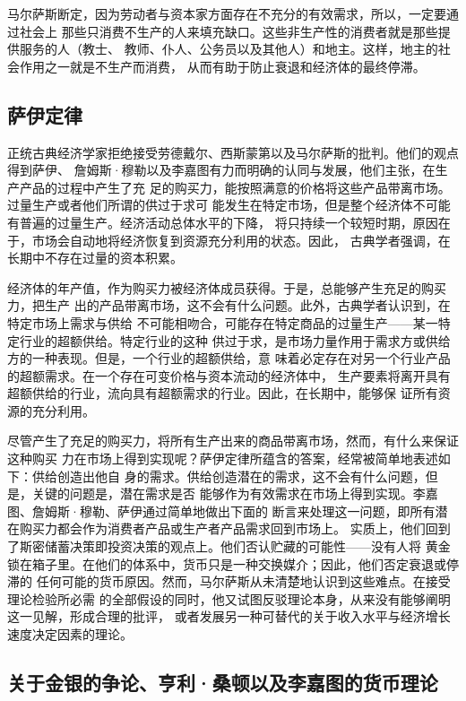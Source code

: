 马尔萨斯断定，因为劳动者与资本家方面存在不充分的有效需求，所以，一定要通过社会上
那些只消费不生产的人来填充缺口。这些非生产性的消费者就是那些提供服务的人（教士、
教师、仆人、公务员以及其他人）和地主。这样，地主的社会作用之一就是不生产而消费，
从而有助于防止衰退和经济体的最终停滞。

\subsection{萨伊定律}

正统古典经济学家拒绝接受劳德戴尔、西斯蒙第以及马尔萨斯的批判。他们的观点得到萨伊、
詹姆斯·穆勒以及李嘉图有力而明确的认同与发展，他们主张，在生产产品的过程中产生了充
足的购买力，能按照满意的价格将这些产品带离市场。过量生产或者他们所谓的供过于求可
能发生在特定市场，但是整个经济体不可能有普遍的过量生产。经济活动总体水平的下降，
将只持续一个较短时期，原因在于，市场会自动地将经济恢复到资源充分利用的状态。因此，
古典学者强调，在长期中不存在过量的资本积累。

经济体的年产值，作为购买力被经济体成员获得。于是，总能够产生充足的购买力，把生产
出的产品带离市场，这不会有什么问题。此外，古典学者认识到，在特定市场上需求与供给
不可能相吻合，可能存在特定商品的过量生产——某一特定行业的超额供给。特定行业的这种
供过于求，是市场力量作用于需求方或供给方的一种表现。但是，一个行业的超额供给，意
味着必定存在对另一个行业产品的超额需求。在一个存在可变价格与资本流动的经济体中，
生产要素将离开具有超额供给的行业，流向具有超额需求的行业。因此，在长期中，能够保
证所有资源的充分利用。

尽管产生了充足的购买力，将所有生产出来的商品带离市场，然而，有什么来保证这种购买
力在市场上得到实现呢？萨伊定律所蕴含的答案，经常被简单地表述如下：供给创造出他自
身的需求。供给创造潜在的需求，这不会有什么问题，但是，关键的问题是，潜在需求是否
能够作为有效需求在市场上得到实现。李嘉图、詹姆斯·穆勒、萨伊通过简单地做出下面的
断言来处理这一问题，即所有潜在购买力都会作为消费者产品或生产者产品需求回到市场上。
实质上，他们回到了斯密储蓄决策即投资决策的观点上。他们否认贮藏的可能性——没有人将
黄金锁在箱子里。在他们的体系中，货币只是一种交换媒介；因此，他们否定衰退或停滞的
任何可能的货币原因。然而，马尔萨斯从未清楚地认识到这些难点。在接受理论检验所必需
的全部假设的同时，他又试图反驳理论本身，从来没有能够阐明这一见解，形成合理的批评，
或者发展另一种可替代的关于收入水平与经济增长速度决定因素的理论。

\subsection{关于金银的争论、亨利·桑顿以及李嘉图的货币理论}

